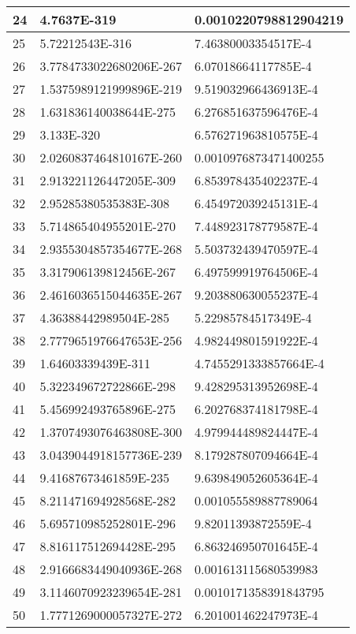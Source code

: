 \begin{center}
\begin{longtable}{ | l | l | l |}
24 &	4.7637E-319 &	0.0010220798812904219 \\ \hline
25 &	5.72212543E-316 &	7.46380003354517E-4 \\ \hline
26 &	3.7784733022680206E-267 &	6.07018664117785E-4 \\ \hline
27 &	1.5375989121999896E-219 &	9.519032966436913E-4 \\ \hline
28 &	1.631836140038644E-275 &	6.276851637596476E-4 \\ \hline
29 &	3.133E-320 &	6.576271963810575E-4 \\ \hline
30 &	2.0260837464810167E-260 &	0.0010976873471400255 \\ \hline
31 &	2.913221126447205E-309 &	6.853978435402237E-4 \\ \hline
32 &	2.95285380535383E-308 &	6.454972039245131E-4 \\ \hline
33 &	5.714865404955201E-270 &	7.448923178779587E-4 \\ \hline
34 &	2.9355304857354677E-268 &	5.503732439470597E-4 \\ \hline
35 &	3.317906139812456E-267 &	6.497599919764506E-4 \\ \hline
36 &	2.4616036515044635E-267 &	9.203880630055237E-4 \\ \hline
37 &	4.36388442989504E-285 &	5.22985784517349E-4 \\ \hline
38 &	2.7779651976647653E-256 &	4.982449801591922E-4 \\ \hline
39 &	1.64603339439E-311 &	4.7455291333857664E-4 \\ \hline
40 &	5.322349672722866E-298 &	9.428295313952698E-4 \\ \hline
41 &	5.456992493765896E-275 &	6.202768374181798E-4 \\ \hline
42 &	1.3707493076463808E-300 &	4.979944489824447E-4 \\ \hline
43 &	3.0439044918157736E-239 &	8.179287807094664E-4 \\ \hline
44 &	9.41687673461859E-235 &	9.639849052605364E-4 \\ \hline
45 &	8.211471694928568E-282 &	0.001055589887789064 \\ \hline
46 &	5.695710985252801E-296 &	9.82011393872559E-4 \\ \hline
47 &	8.816117512694428E-295 &	6.863246950701645E-4 \\ \hline
48 &	2.9166683449040936E-268 &	0.001613115680539983 \\ \hline
49 &	3.1146070923239654E-281 &	0.0010171358391843795 \\ \hline
50 &	1.7771269000057327E-272 &	6.201001462247973E-4 \\ \hline
 \end{longtable}
\end{center}

